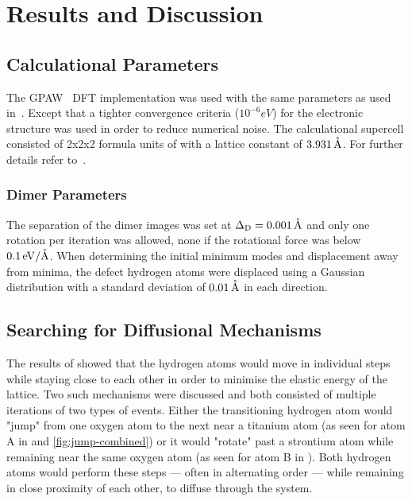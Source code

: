 \section{Results and Discussion}
\label{sec:perovskites-results}

\subsection{Calculational Parameters}
The GPAW~\cite{gpaw-review-2010} DFT implementation was used with the same parameters as used in~\cite{double-defect-2011}.
Except that a tighter convergence criteria ($10^{-6} \unit{eV}$) for the electronic structure was used in order to reduce numerical noise.
The calculational supercell consisted of 2x2x2 formula units of  with a lattice constant of $3.931\, \mathrm{\mathring{\mathrm{A}}}$.
For further details refer to~\cite{double-defect-2011}.

\subsubsection{Dimer Parameters}
The separation of the dimer images was set at $\Delta_\text{D} = 0.001\, \mathrm{\mathring{\mathrm{A}}}$ and only one rotation per iteration was allowed, none if the rotational force was below $0.1\, \mathrm{eV/\mathring{\mathrm{A}}}$.
When determining the initial minimum modes and displacement away from minima, the defect hydrogen atoms were displaced using a Gaussian distribution with a standard deviation of $0.01 \, \mathrm{\mathring{\mathrm{A}}}$ in each direction.

\subsection{Searching for Diffusional Mechanisms}
The results of \cite{double-defect-2011} showed that the hydrogen atoms would move in individual steps while staying close to each other in order to minimise the elastic energy of the lattice.
Two such mechanisms were discussed and both consisted of multiple iterations of two types of events.
Either the transitioning hydrogen atom would "jump" from one oxygen atom to the next near a titanium atom (as seen for atom A in  and \ref{fig:jump-combined}) or it would "rotate" past a strontium atom while remaining near the same oxygen atom (as seen for atom B in ).
Both hydrogen atoms would perform these steps --- often in alternating order --- while remaining in close proximity of each other, to diffuse through the system.

